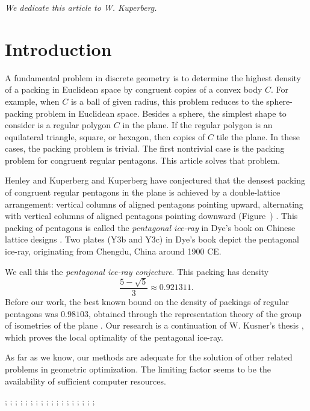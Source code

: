 \centerline{\it We dedicate this article to W. Kuperberg.}

\section{Introduction} 

A fundamental problem in discrete geometry is to determine the highest
density of a packing in Euclidean space by congruent copies of a
convex body $C$.  For example, when $C$ is a ball of given radius,
this problem reduces to the sphere-packing problem in Euclidean space.
Besides a sphere, the simplest shape to consider is a regular polygon
$C$ in the plane.  If the regular polygon is an equilateral
triangle, square, or hexagon, then copies of $C$ tile the plane.  In
these cases, the packing problem is trivial.  The first nontrivial
case is the packing problem for congruent regular pentagons.  This
article solves that problem.

Henley and Kuperberg and Kuperberg have conjectured that the densest
packing of congruent regular pentagons in the plane is achieved by a
double-lattice arrangement: vertical columns of aligned pentagons
pointing upward, alternating with vertical columns of aligned
pentagons pointing downward (Figure~)
\cite{Kup} \cite[p.801]{henley}.  This packing of pentagons is called
the {\it pentagonal ice-ray} in Dye's book on Chinese lattice designs
\cite{dye}.  Two plates (Y3b and Y3c) in Dye's book depict the
pentagonal ice-ray, originating from Chengdu, China around 1900 CE.

We call this the {\it pentagonal ice-ray  conjecture}.
This packing has density
\[
\frac{5 - \sqrt{5}}3 \approx 0.921311.
\] %
Before our work, the best known bound on the density of packings of
regular pentagons was $0.98103$, obtained through the representation
theory of the group of isometries of the plane \cite{val}.  Our
research is a continuation of W. Kusner's thesis \cite{Kus}, which
proves the local optimality of the pentagonal ice-ray.

As far as we know, our methods are adequate for the solution of other
related problems in geometric optimization.  The limiting factor seems
to be the availability of sufficient computer resources.

{
;  %
;  %
;  
;  %
; 
;  
;  
;  %
; 
;  
;  
;  %
;  %
; 
;  %
; 
;  
;   
}

